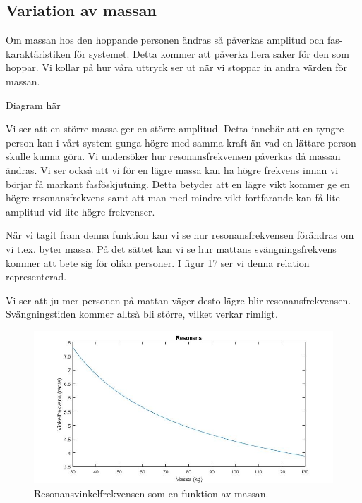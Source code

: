 \documentclass[10pt,a4paper]{article}
\begin{document}
\subsection{Variation av massan}

Om massan hos den hoppande personen ändras så påverkas amplitud och fas-karaktäristiken för systemet. Detta kommer att påverka flera saker för den som hoppar. Vi kollar på hur våra uttryck ser ut när vi stoppar in andra värden för massan. 

Diagram här

Vi ser att en större massa ger en större amplitud. Detta innebär att en tyngre person kan i vårt system gunga högre med samma kraft än vad en lättare person skulle kunna göra. Vi undersöker hur resonansfrekvensen påverkas då massan ändras. Vi ser också att vi för en lägre massa kan ha högre frekvens innan vi börjar få markant fasföskjutning. Detta betyder att en lägre vikt kommer ge en högre resonansfrekvens samt att man med mindre vikt fortfarande kan få lite amplitud vid lite högre frekvenser.

När vi tagit fram denna funktion kan vi se hur resonansfrekvensen förändras om vi t.ex. byter massa. På det sättet kan vi se hur mattans svängningsfrekvens kommer att bete sig för olika personer. I figur 17 ser vi denna relation representerad.

Vi ser att ju mer personen på mattan väger desto lägre blir resonansfrekvensen. Svängningstiden kommer alltså bli större, vilket verkar rimligt.

\begin{figure}[h]
\begin{center}
\includegraphics[scale=0.4]{resonans}
\caption{Resonansvinkelfrekvensen som en funktion av massan.}
\end{center}
\end{figure}
\end{document}
